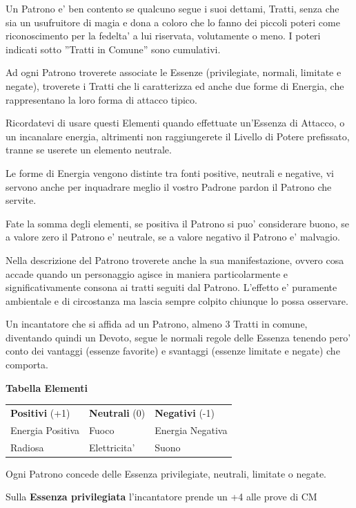 \documentclass[a4paper,11pt,twoside,openany]{book}
\begin{document}
{Un Patrono e' ben contento se qualcuno segue i suoi dettami, Tratti, senza che sia un usufruitore di magia e dona a coloro che lo fanno dei piccoli poteri come riconoscimento per la fedelta' a lui riservata, volutamente o meno. I poteri indicati sotto ''Tratti in Comune'' sono cumulativi.

Ad ogni Patrono troverete associate le Essenze (privilegiate, normali, limitate e negate), troverete i Tratti che li caratterizza ed anche due forme di Energia, che rappresentano la loro forma di attacco tipico. 

Ricordatevi di usare questi Elementi quando effettuate un'Essenza di Attacco, o un incanalare energia, altrimenti non raggiungerete il Livello di Potere prefissato, tranne se userete un elemento neutrale. 

Le forme di Energia vengono distinte tra fonti positive, neutrali e negative, vi servono anche per inquadrare meglio il vostro Padrone pardon il Patrono che servite.

Fate la somma degli elementi, se positiva il Patrono si puo' considerare buono, se a valore zero il Patrono e' neutrale, se a valore negativo il Patrono e' malvagio.

Nella descrizione del Patrono troverete anche la sua manifestazione, ovvero cosa accade quando un personaggio agisce in maniera particolarmente e significativamente consona ai tratti seguiti dal Patrono. L'effetto e' puramente ambientale e di circostanza ma lascia sempre colpito chiunque lo possa osservare.

Un incantatore che si affida ad un Patrono, almeno 3 Tratti in comune, diventando quindi un Devoto, segue le normali regole delle Essenza tenendo pero' conto dei vantaggi (essenze favorite) e svantaggi (essenze limitate e negate) che comporta.

\bigskip

\textbf{Tabella Elementi}
\medskip

\begin{tabular}{lll}
\toprule
\textbf{Positivi} (+1) & \textbf{Neutrali} (0) & \textbf{Negativi} (-1)\tabularnewline
Energia Positiva & Fuoco & Energia Negativa\tabularnewline
Radiosa & Elettricita' & Suono\tabularnewline
\end{tabular}
\bigskip

Ogni Patrono concede delle Essenza privilegiate, neutrali, limitate o negate.

Sulla \textbf{Essenza privilegiata} l'incantatore prende un +4 alle prove di CM

}
\end{document}
